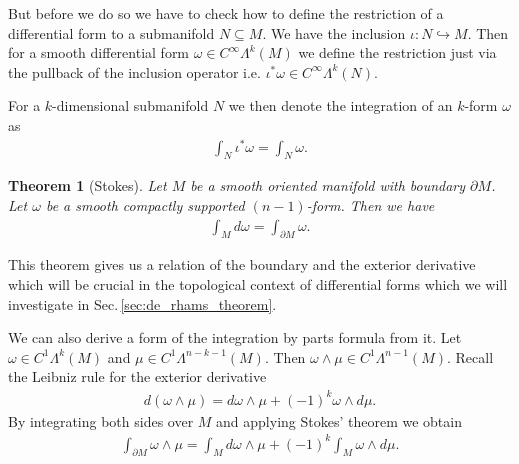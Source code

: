 \documentclass[12pt,a4paper]{article}
\numberwithin{equation}{subsection}
\numberwithin{lemma}{subsection}
\newtheorem{theorem}[lemma]{Theorem}
\theoremstyle{definition}
\begin{document}
But before we do so we have to check how to define the restriction of a
differential form to a submanifold $N \subseteq M$. 
We have the inclusion $\iota: N \hookrightarrow M$. Then for a 
smooth differential form $\omega \in C^\infty \Lambda^k (M)$ we define 
the restriction just via the pullback of the inclusion operator i.e. 
$\iota^* \omega \in C^\infty \Lambda^k(N)$. 

For a $k$-dimensional submanifold $N$ we then denote the integration of an 
$k$-form $\omega$ as
\begin{align*}
    \int_N \iota^*\omega = \int_N \omega.
\end{align*} 

\begin{theorem}[Stokes]
    Let $M$ be a smooth oriented manifold with boundary 
    $\partial M$. Let $\omega$ be 
    a smooth compactly supported $(n-1)$-form. Then we have 
    \begin{align*}
        \int_M d\omega = \int_{\partial M} \omega.
    \end{align*}
\end{theorem}
This theorem gives us a relation of the boundary and the exterior derivative 
which will be crucial in the topological context of differential forms 
which we will investigate in Sec.\,\ref{sec:de_rhams_theorem}. 

We can also derive a form of the integration by parts formula from it. 
Let $\omega \in C^1 \Lambda^k (M)$ and $\mu \in C^1 \Lambda^{n-k-1}(M)$. 
Then $\omega \wedge \mu \in C^1 \Lambda^{n-1} (M)$. Recall the 
Leibniz rule for the exterior derivative 
\begin{align*}
    d(\omega \wedge \mu) = d\omega \wedge \mu + (-1)^k \omega \wedge d\mu. 
\end{align*}
By integrating both sides over $M$ and applying Stokes' theorem we obtain
\begin{align*}
    \int_{\partial M} \omega \wedge \mu 
    = \int_M d\omega \wedge \mu + (-1)^k \int_M \omega \wedge d\mu.
\end{align*}
\end{document}
